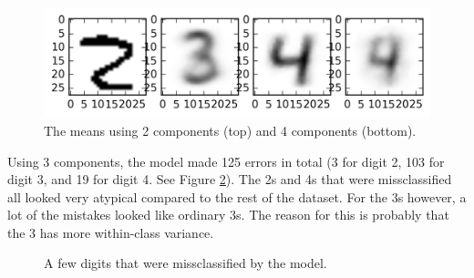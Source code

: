 \documentclass[a4paper]{article}
\begin{document}
\begin{enumerate}
\begin{figure}
\includegraphics[width=.6\linewidth]{figures/means4.png}
\caption{The means using 2 components (top) and 4 components (bottom).}
\label{fig:diff_means}
\end{figure}

Using 3 components, the model made 125 errors in total (3 for digit 2, 103 for digit 3, and 19 for digit 4. See Figure \ref{fig:missers}). The 2s and 4s that were missclassified all looked very atypical compared to the rest of the dataset. For the 3s however, a lot of the mistakes looked like ordinary 3s. The reason for this is probably that the 3 has more within-class variance.

\begin{figure}
\centering
{}
\caption{A few digits that were missclassified by the model.}
\label{fig:missers}
\end{figure}


\end{enumerate}
\end{document}
